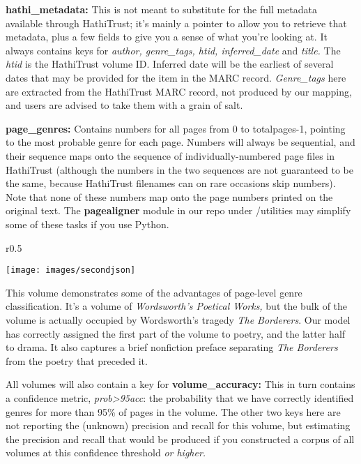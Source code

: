 \documentclass[paper=a4, fontsize=12pt]{scrartcl}
\numberwithin{equation}{section}		%
\numberwithin{figure}{section}			%
\numberwithin{table}{section}				%
\begin{document}
\vspace{2mm}
\noindent \textbf{hathi\_metadata:} This is not meant to substitute for the full metadata available through HathiTrust; it's mainly a pointer to allow you to retrieve that metadata, plus a few fields to give you a sense of what you're looking at. It always contains keys for \textit{author, genre\_tags, htid, inferred\_date} and \textit{title.} The \textit{htid} is the HathiTrust volume ID. Inferred date will be the earliest of several dates that may be provided for the item in the MARC record. \textit{Genre\_tags} here are extracted from the HathiTrust MARC record, not produced by our mapping, and users are advised to take them with a grain of salt.

\vspace{2mm}
\noindent \textbf{page\_genres:} Contains numbers for all pages from 0 to totalpages-1, pointing to the most probable genre for each page. Numbers will always be sequential, and their sequence maps onto the sequence of individually-numbered page files in HathiTrust (although the numbers in the two sequences are not guaranteed to be the same, because HathiTrust filenames can on rare occasions skip numbers). Note that none of these numbers map onto the page numbers printed on the original text. The \textbf{pagealigner} module in our repo under /utilities may simplify some of these tasks if you use Python.

\begin{wrapfigure}[26]{r}{0.5\textwidth}
  \begin{centering}
    \texttt{[image: images/secondjson]}
  \end{centering}
\end{wrapfigure}

This volume demonstrates some of the advantages of page-level genre classification. It's a volume of \textit{Wordsworth's Poetical Works,} but the bulk of the volume is actually occupied by Wordsworth's tragedy \textit{The Borderers}. Our model has correctly assigned the first part of the volume to poetry, and the latter half to drama. It also captures a brief nonfiction preface separating \textit{The Borderers} from the poetry that preceded it.

\vspace{2mm}
\noindent All volumes will also contain a key for \textbf{volume\_accuracy:} This in turn contains a confidence metric, \textit{prob>95acc}: the probability that we have correctly identified genres for more than 95\% of pages in the volume. The other two keys here are not reporting the (unknown) precision and recall for this volume, but estimating the precision and recall that would be produced if you constructed a corpus of all volumes at this confidence threshold \textit{or higher.}
\end{document}
